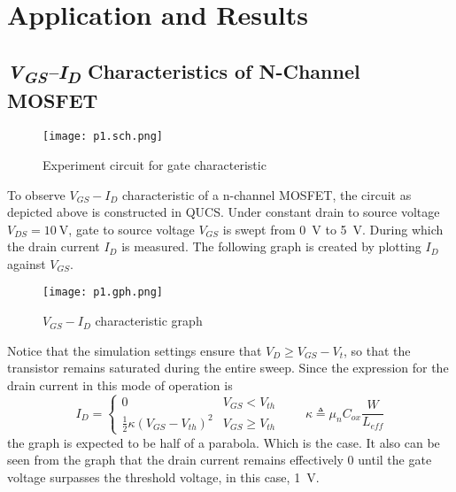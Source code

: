 \documentclass[../main.tex]{subfiles}
\begin{document}
\section{Application and Results}

    \subsection{\textit{V\textsubscript{GS}--I\textsubscript{D}} Characteristics of N-Channel MOSFET}
        \begin{figure}[H]\centering
            \texttt{[image: p1.sch.png]}
            \caption{Experiment circuit for gate characteristic}\label{fig:p1.sch}
        \end{figure}

        To observe $V_{GS}-I_D$ characteristic of a n-channel MOSFET, the circuit as depicted above is 
        constructed in QUCS. Under constant drain to source voltage $V_{DS}=\SI{10}{\volt}$, gate to source
        voltage $V_{GS}$ is swept from \SI{0}{\volt} to \SI{5}{\volt}. During which the drain current $I_D$ 
        is measured. The following graph is created by plotting $I_D$ against $V_{GS}$.

        \begin{figure}[H]\centering
            \texttt{[image: p1.gph.png]}
            \caption{$V_{GS}-I_D$ characteristic graph}\label{fig:p1.gph}
        \end{figure}

        Notice that the simulation settings ensure that $V_D \geq V_{GS}-V_t$, so that the transistor remains 
        saturated during the entire sweep. Since the expression for the drain current in this mode of operation is 
        \begin{equation*}
            I_D = 
            \begin{cases}
                0 &V_{GS} < V_{th} \\
                \frac{1}{2} \kappa (V_{GS}-V_{th})^2 &V_{GS} \geq V_{th}                
            \end{cases}
            \qquad \kappa \triangleq \mu_{n}C_{ox}\frac{W}{L_{eff}}         
        \end{equation*}
        the graph is expected to be half of a parabola. Which is the case. It also can be seen from the graph that 
        the drain current remains effectively 0 until the gate voltage surpasses the threshold voltage, in this 
        case, \SI{1}{\volt}.
\end{document}
